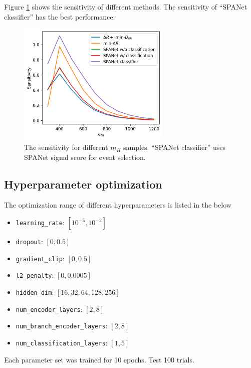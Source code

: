 \documentclass[12pt]{article}
\begin{document}
		Figure \ref{fig:sensitivity_mass_SPANET_classifier} shows the sensitivity of different methods. The sensitivity of ``SPANet classifier'' has the best performance.
		\begin{figure}[htpb]
			\centering
			\includegraphics[width=0.65\textwidth]{sensitivity_mass-DHH_mindR-SPANet-classifier.png}
			\caption{The sensitivity for different $m_H$ samples. ``SPANet classifier'' uses SPANet signal score for event selection.}
			\label{fig:sensitivity_mass_SPANET_classifier}
		\end{figure}

	\subsection{Hyperparameter optimization}%
	\label{sub:hyperparameter_optimization}
		The optimization range of different hyperparameters is listed in the below
		\begin{itemize}
			\item \verb+learning_rate+: $[10^{-5}, 10^{-2}]$ 
			\item \verb+dropout+: $[0, 0.5]$ 
			\item \verb+gradient_clip+: $[0, 0.5]$ 
			\item \verb+l2_penalty+: $[0, 0.0005]$ 
			\item \verb+hidden_dim+: $[16,32,64,128,256]$ 
			\item \verb+num_encoder_layers+: $[2,8]$ 
			\item \verb+num_branch_encoder_layers+: $[2,8]$ 
			\item \verb+num_classification_layers+: $[1,5]$ 
		\end{itemize}
		Each parameter set was trained for 10 epochs. Test 100 trials.
\end{document}
